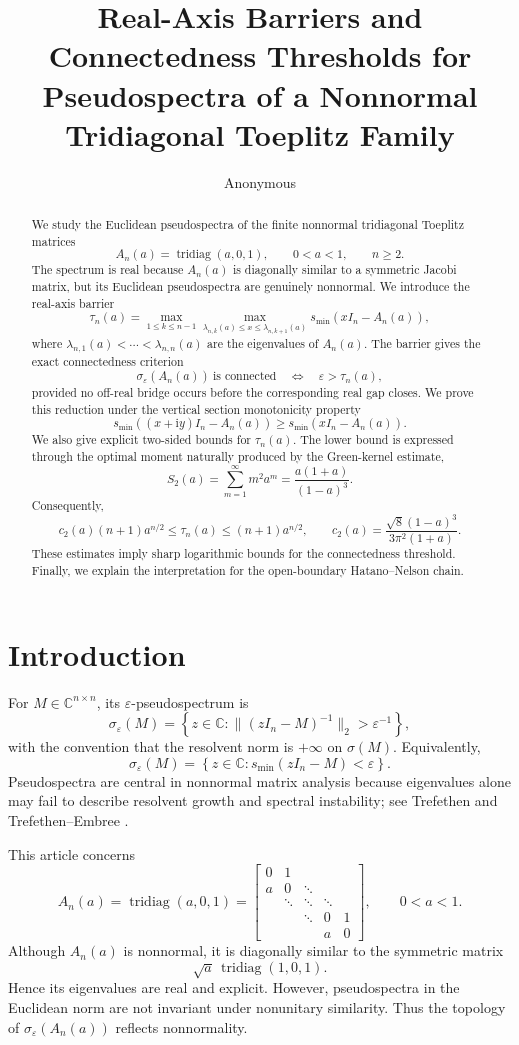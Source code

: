 \documentclass[11pt]{amsart}
\title[Connectedness thresholds for Toeplitz pseudospectra]
{Real-Axis Barriers and Connectedness Thresholds for Pseudospectra of a Nonnormal Tridiagonal Toeplitz Family}
\author{Anonymous}
\numberwithin{equation}{section}
\DeclareMathOperator{\tridiag}{tridiag}
\newcommand{\C}{\mathbb C}
\newcommand{\eps}{\varepsilon}
\newcommand{\ii}{\mathrm i}
\begin{document}
\begin{abstract}
We study the Euclidean pseudospectra of the finite nonnormal tridiagonal Toeplitz matrices
\[
A_n(a)=\tridiag(a,0,1),\qquad 0<a<1,\qquad n\ge2.
\]
The spectrum is real because \(A_n(a)\) is diagonally similar to a symmetric Jacobi matrix, but its Euclidean pseudospectra are genuinely nonnormal.  We introduce the real-axis barrier
\[
\tau_n(a)
=
\max_{1\le k\le n-1}
\max_{\lambda_{n,k}(a)\le x\le \lambda_{n,k+1}(a)}
s_{\min}(xI_n-A_n(a)),
\]
where \(\lambda_{n,1}(a)<\cdots<\lambda_{n,n}(a)\) are the eigenvalues of \(A_n(a)\).  The barrier gives the exact connectedness criterion
\[
\sigma_\eps(A_n(a))\ \text{is connected}
\quad\Longleftrightarrow\quad
\eps>\tau_n(a),
\]
provided no off-real bridge occurs before the corresponding real gap closes.  We prove this reduction under the vertical section monotonicity property
\[
s_{\min}((x+\ii y)I_n-A_n(a))
\ge
s_{\min}(xI_n-A_n(a)).
\]
We also give explicit two-sided bounds for \(\tau_n(a)\).  The lower bound is expressed through the optimal moment naturally produced by the Green-kernel estimate,
\[
S_2(a)=\sum_{m=1}^{\infty}m^2a^m=\frac{a(1+a)}{(1-a)^3}.
\]
Consequently,
\[
c_2(a)(n+1)a^{n/2}
\le
\tau_n(a)
\le
(n+1)a^{n/2},
\qquad
c_2(a)=\frac{\sqrt8(1-a)^3}{3\pi^2(1+a)}.
\]
These estimates imply sharp logarithmic bounds for the connectedness threshold.  Finally, we explain the interpretation for the open-boundary Hatano--Nelson chain.
\end{abstract}

\maketitle

\section{Introduction}

For \(M\in\C^{n\times n}\), its \(\eps\)-pseudospectrum is
\[
\sigma_\eps(M)
=
\left\{
z\in\C:\|(zI_n-M)^{-1}\|_2>\eps^{-1}
\right\},
\]
with the convention that the resolvent norm is \(+\infty\) on \(\sigma(M)\).  Equivalently,
\[
\sigma_\eps(M)
=
\left\{
z\in\C:s_{\min}(zI_n-M)<\eps
\right\}.
\]
Pseudospectra are central in nonnormal matrix analysis because eigenvalues alone may fail to describe resolvent growth and spectral instability; see Trefethen \cite{Trefethen1997} and Trefethen--Embree \cite{TrefethenEmbree2005}.

This article concerns
\[
A_n(a)
=
\tridiag(a,0,1)
=
\begin{bmatrix}
0 & 1 \\
a & 0 & \ddots \\
& \ddots & \ddots & \ddots \\
&& \ddots & 0 & 1 \\
&&& a & 0
\end{bmatrix},
\qquad 0<a<1.
\]
Although \(A_n(a)\) is nonnormal, it is diagonally similar to the symmetric matrix
\[
\sqrt a\,\tridiag(1,0,1).
\]
Hence its eigenvalues are real and explicit.  However, pseudospectra in the Euclidean norm are not invariant under nonunitary similarity.  Thus the topology of \(\sigma_\eps(A_n(a))\) reflects nonnormality.
\end{document}
